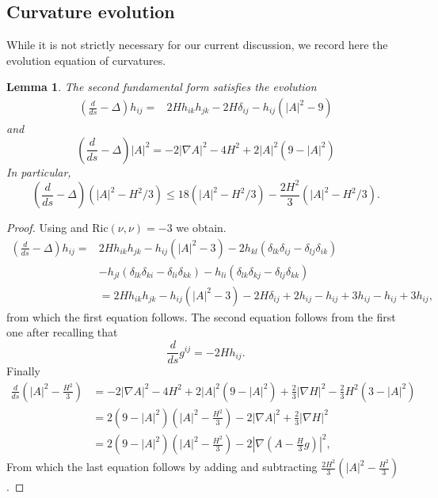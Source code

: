 \documentclass[leqno,11pt]{amsart}
\newtheorem{lemma}[theorem]{Lemma}
\theoremstyle{definition}
\newcommand{\Ric}{\mathrm{Ric}}
\begin{document}
\subsection*{Curvature evolution} While it is not strictly necessary for our current discussion, we record here the evolution equation of curvatures.
\begin{lemma}
The second fundamental form satisfies the evolution
\begin{align}
\left(\frac{d}{ds}-\Delta\right)h_{ij}=&2Hh_{ik}h_{jk}-2H\delta_{ij}-h_{ij}(|A|^2-9)
\end{align}
and
\begin{equation}
\left(\frac{d}{ds}-\Delta\right)|A|^2=-2|\nabla A|^2-4H^2+2|A|^2(9-|A|^2) 
\end{equation}
In particular, 
\begin{equation}
\left(\frac{d}{ds}-\Delta\right)\left(|A|^2-H^2/3\right) \leq 18\left(|A|^2-H^2/3\right)-\frac{2H^2}{3}\left(|A|^2-H^2/3\right).
\end{equation}
\end{lemma}
\begin{proof}
Using \cite[Prop. 3.3]{Ecker_Huisken_lor} and $\Ric(\nu,\nu)=-3$ we obtain.
\begin{align}
\left(\frac{d}{ds}-\Delta\right)h_{ij}=&2Hh_{ik}h_{jk}-h_{ij}(|A|^2-3)-2h_{kl}(\delta_{lk}\delta_{ij}-\delta_{lj}\delta_{ik})\\
&-h_{jl}(\delta_{lk}\delta_{ki}-\delta_{li}\delta_{kk})-h_{li}(\delta_{lk}\delta_{kj}-\delta_{lj}\delta_{kk})\\
&=2Hh_{ik}h_{jk}-h_{ij}(|A|^2-3)-2H\delta_{ij}+2h_{ij}-h_{ij}+3h_{ij}-h_{ij}+3h_{ij},
\end{align}
from which the first equation follows. The second equation follows from the first one after recalling that
\begin{equation}
\frac{d}{ds}g^{ij}=-2Hh_{ij}.
\end{equation}
Finally
\begin{align}
\frac{d}{ds}\left(|A|^2-\frac{H^2}{3}\right)&=-2|\nabla A|^2-4H^2+2|A|^2(9-|A|^2)+\frac{2}{3}|\nabla H|^2-\frac{2}{3}{H^2}(3-|A|^2)\\
&=2(9-|A|^2)\left(|A|^2-\frac{H^2}{3}\right)-2|\nabla A|^2+\frac{2}{3}|\nabla H|^2\\
&=2(9-|A|^2)\left(|A|^2-\frac{H^2}{3}\right)-2\left|\nabla \left(A-\frac{H}{3}g\right)\right|^2,
\end{align}
From which the last equation follows by adding and subtracting $\frac{2H^2}{3}\left(|A|^2-\frac{H^2}{3}\right)$.
\end{proof}
\end{document}
